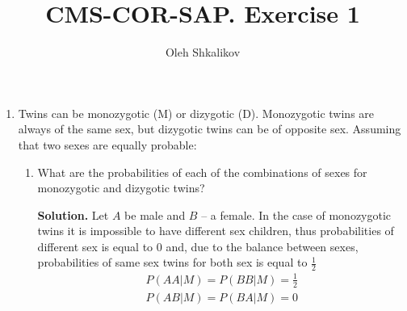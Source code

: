 \documentclass[a4paper, 12pt]{article}
\title{CMS-COR-SAP. Exercise 1}
\author{Oleh Shkalikov}
\newcommand{\task}[2]{
    \item #1
    \begin{mdframed} \textbf{Solution. } #2 \end{mdframed}
}
\begin{document}
\maketitle

\begin{enumerate}
    \item Twins can be monozygotic (M) or dizygotic (D). Monozygotic
          twins are always of the same sex, but dizygotic twins can be
          of opposite sex. Assuming that two sexes are equally probable:
          \begin{enumerate}
              \task{What are the probabilities of each of the combinations
                  of sexes for monozygotic and dizygotic twins?}
              {Let $A$ be male and $B$ -- a female. In the case of monozygotic
                  twins it is impossible to have different sex children, thus probabilities
                  of different sex is equal to $0$ and, due to the balance between
                  sexes, probabilities of same sex twins for both sex is equal to $\frac{1}{2}$
                  \begin{align*}
                      P(AA | M) = P(BB | M) = \frac{1}{2} \\
                      P(AB | M) = P(BA | M) = 0
                  \end{align*}

}
\end{enumerate}
\end{enumerate}
\end{document}
